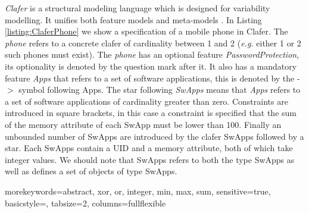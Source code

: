 \documentclass{article}
\newcommand{\eg}{\emph{e.g.}\xspace}
\begin{document}
\emph{Clafer} is a structural modeling language which is designed for variability modelling. It unifies both feature models  and meta-models \cite{BakClaferSLE2010}.
%
In Listing \ref{listing:ClaferPhone}  we show a specification of a mobile phone in Clafer. 
%
The \emph{phone} refers to a concrete clafer of cardinality between 1 and 2 (\eg either 1 or 2 such phones must exist). The \emph{phone} has an optional feature \emph{PasswordProtection}, its optionality is denoted by the question mark after it. It also has a mandatory feature \emph{Apps} that refers  to a set of software applications, this is denoted by the  -$>$ symbol following  Apps. 
%
The star following  \emph{SwApps} means that \emph{Apps} refers to a set of software applications of cardinality greater than zero. 
%
Constraints are introduced in  square brackets, in this case a constraint is specified that the sum of the memory attribute of each SwApp must be lower than 100. 
%
Finally an unbounded number of SwApps are introduced by the clafer SwApps followed by a star. Each SwApps contain a UID and a memory attribute, both of which take integer values.  
%
We should note that SwApps refers to both the type SwApps as well as defines a set of objects of type SwApps.

{morekeywords={abstract, xor, or, integer, min, max, sum},
sensitive=true,
basicstyle={\sffamily\small},
tabsize=2,
columns=fullflexible
}
\end{document}
